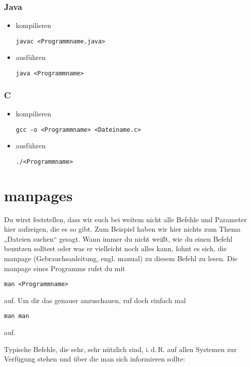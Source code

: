 \documentclass[a4paper,12pt]{article}
\begin{document}
\subsubsection{Java}
\begin{itemize}
\item kompilieren 
\begin{lstlisting}
javac <Programmname.java>
\end{lstlisting} 
\item ausführen
\begin{lstlisting}
java <Programmname>
\end{lstlisting} 
\end{itemize}

\subsubsection{C}
\begin{itemize}
\item kompilieren
\begin{lstlisting}
gcc -o <Programmname> <Dateiname.c>
\end{lstlisting} 
\item ausführen
\begin{lstlisting}
./<Programmname>
\end{lstlisting} 
\end{itemize}

\section{manpages}
\label{sec:man}
Du wirst feststellen, dass wir euch bei weitem nicht alle Befehle und 
Parameter hier aufzeigen, die es so gibt. Zum Beispiel haben wir hier 
nichts zum Thema „Dateien suchen“ gesagt. Wann immer du nicht 
weißt, wie du einen Befehl benutzen solltest oder was er vielleicht 
noch alles kann, lohnt es sich, die manpage (Gebrauchsanleitung, engl. 
manual) zu diesem Befehl zu lesen. Die manpage eines Programms rufst du 
mit 
\begin{lstlisting}
man <Programmname>
\end{lstlisting} 
 auf. Um dir das genauer anzuschauen, ruf doch einfach mal 
\begin{lstlisting}
man man
\end{lstlisting} 
auf.

Typische Befehle, die sehr, sehr nützlich sind, i.\,d.\,R. auf allen Systemen zur Verfügung stehen und über die man sich informieren sollte:
\end{document}
